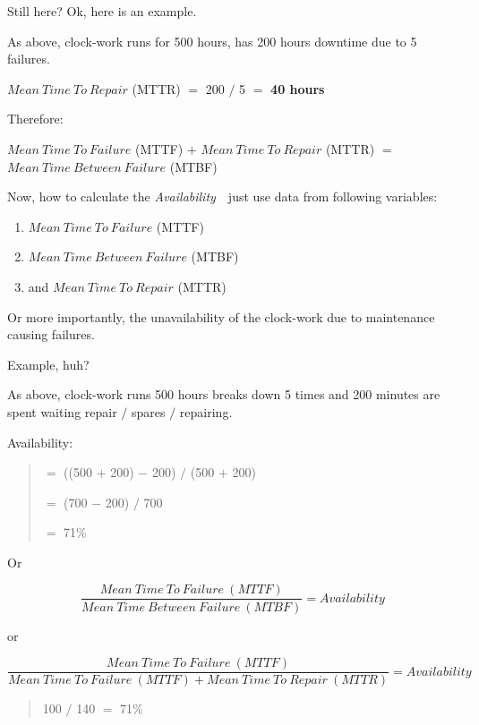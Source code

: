 Still here? Ok, here is an example.

As above, clock-work runs for 500 hours, has 200 hours downtime due to 5 failures.

$Mean~Time~To~Repair$ (MTTR)  $=$  200  $/$  5  $=$  \textbf{40 hours}

Therefore: 

$Mean~Time~To~Failure$ (MTTF)  $+$  $Mean~Time~To~Repair$ (MTTR) $=$  $Mean~Time~Between~Failure$ (MTBF)

Now, how to calculate the \emph{Availability}~\textemdash~just use data from following variables:

\begin{enumerate}

 \item $Mean~Time~To~Failure$ (MTTF)
 \item $Mean~Time~Between~Failure$ (MTBF)
 \item and $Mean~Time~To~Repair$ (MTTR)
\end{enumerate}

Or more importantly, the unavailability of the clock-work due to maintenance causing failures.

Example, huh?

As above, clock-work runs 500 hours breaks down 5 times and 200 minutes are spent waiting repair $/$ spares $/$ repairing.

Availability:
\begin{quote}

 $=$  ((500 $+$ 200) $-$ 200) $/$ (500 $+$ 200)

 $=$  (700 $-$ 200) $/$ 700

 $=$  71\%
\end{quote}

Or

\begin{equation}\label{eq:Availability calculation}
\frac{Mean~Time~To~Failure~(MTTF)}
{Mean~Time~Between~Failure~(MTBF)} =  Availability
\end{equation}

or 


\begin{equation}\label{eq:Same Availability calculation}
\frac{Mean~Time~To~Failure~(MTTF)}
{Mean~Time~To~Failure~(MTTF)  +  Mean~Time~To~Repair~(MTTR)}  =  Availability
\end{equation}

\begin{quote}
100 $/$ 140  $=$  71\% 
\end{quote}

